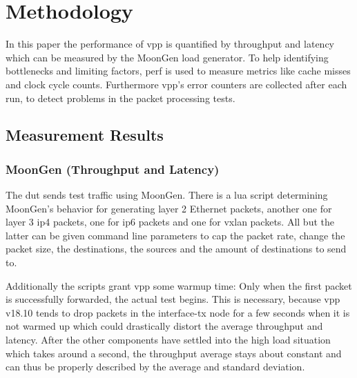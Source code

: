 
\chapter{Methodology}
\label{sec:methodology}






In this paper the performance of \Ac{vpp} is quantified by throughput
and latency which can be measured by the MoonGen
\cite{emmerich2015moongen} load generator. To help identifying
bottlenecks and limiting factors, \Ac{perf} is used to measure metrics
like cache misses and clock cycle counts. Furthermore \Ac{vpp}'s error
counters are collected after each run, to detect problems in the
packet processing tests.


\section{Measurement Results}



\subsection{MoonGen (Throughput and Latency)} 


The \Ac{dut} sends test traffic using MoonGen. There is a lua script
determining MoonGen's behavior for generating layer 2 Ethernet
packets, another one for layer 3 \Ac{ip4} packets, one for \Ac{ip6}
packets and one for \Ac{vxlan} packets. All but the latter can be
given command line parameters to cap the packet rate, change the
packet size, the destinations, the sources and the amount of
destinations to send to.

Additionally the scripts grant \Ac{vpp} some warmup time: Only when
the first packet is successfully forwarded, the actual test begins.
This is necessary, because \Ac{vpp} v18.10 tends to drop packets in
the interface-tx node for a few seconds when it is not warmed up which
could drastically distort the average throughput and latency. After
the other components have settled into the high load situation which
takes around a second, the throughput average stays about constant and
can thus be properly described by the average and standard deviation.

